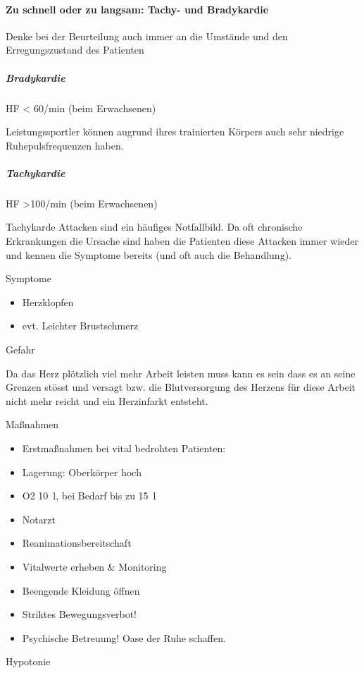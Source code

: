 \documentclass{article}
\begin{document}
\paragraph{Zu schnell oder zu langsam: Tachy- und Bradykardie}
Denke bei der Beurteilung auch immer an die Umst\"ande und den
Erregungszustand des Patienten

\subparagraph{Bradykardie }
HF {\textless} 60/min (beim Erwachsenen)

Leistungssportler k\"onnen augrund ihres trainierten K\"orpers auch sehr
niedrige Ruhepulsfrequenzen haben. 

\subparagraph{Tachykardie }
HF {\textgreater}100/min (beim Erwachsenen)

Tachykarde Attacken sind ein h\"aufiges Notfallbild. Da oft chronische
Erkrankungen die Ursache sind  haben die Patienten diese Attacken immer
wieder und kennen die Symptome bereits (und oft auch die Behandlung). 

Symptome

\begin{itemize}
\item Herzklopfen

\item evt. Leichter Brustschmerz

\end{itemize}
Gefahr

Da das Herz pl\"otzlich viel mehr Arbeit leisten muss kann es sein dass
es an seine Grenzen st\"osst und versagt bzw. die Blutversorgung des
Herzens f\"ur diese Arbeit nicht mehr reicht und ein Herzinfarkt
entsteht. 

Ma{\ss}nahmen

\begin{itemize}
\item Erstma{\ss}nahmen bei vital bedrohten Patienten: 

\end{itemize}
\begin{itemize}
\item Lagerung: Oberk\"orper hoch

\item O2 10~l, bei Bedarf bis zu 15~l

\item Notarzt

\item Reanimationsbereitschaft

\end{itemize}
\begin{itemize}
\item Vitalwerte erheben \& Monitoring 

\item Beengende Kleidung \"offnen

\item Striktes Bewegungsverbot!

\item Psychische Betreuung! Oase der Ruhe schaffen. 

\end{itemize}
Hypotonie
\end{document}
